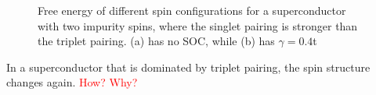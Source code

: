 \begin{figure}[H]
    \centering
    \label{fig:spin_sSC}
    \caption{Free energy of different spin configurations for a superconductor with two impurity spins, where the singlet pairing is stronger than the triplet pairing. (a) has no SOC, while (b) has $\gamma=0.4$t }
\end{figure}

In a superconductor that is dominated by triplet pairing, the spin structure changes again.
\textcolor{red}{How? Why?}

